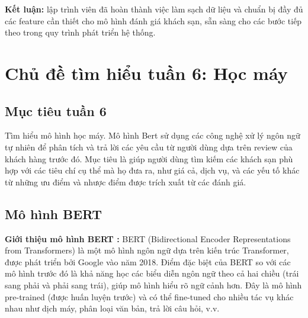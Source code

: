 \textbf{Kết luận:} lập trình viên đã hoàn thành việc làm sạch dữ liệu và chuẩn bị đầy đủ các feature cần thiết cho mô hình đánh giá khách sạn, sẵn sàng cho các bước tiếp theo trong quy trình phát triển hệ thống.

\section{Chủ đề tìm hiểu tuần 6: Học máy}
\subsection{Mục tiêu tuần 6}
\setcounter{figure}{0} 
\renewcommand{\thefigure}{3.\arabic{figure}}
Tìm hiểu mô hình học máy. Mô hình Bert sử dụng các công nghệ xử lý ngôn ngữ tự nhiên để phân tích và trả lời các yêu cầu từ người dùng dựa trên review của khách hàng trước đó. Mục tiêu là giúp người dùng tìm kiếm các khách sạn phù hợp với các tiêu chí cụ thể mà họ đưa ra, như giá cả, dịch vụ, và các yếu tố khác từ những ưu điểm và nhược điểm được trích xuất từ các đánh giá.

\subsection{Mô hình BERT}
 \textbf{Giới thiệu mô hình BERT :} BERT (Bidirectional Encoder Representations from Transformers) là một mô hình ngôn ngữ dựa trên kiến trúc Transformer, được phát triển bởi Google vào năm 2018. Điểm đặc biệt của BERT so với các mô hình trước đó là khả năng học các biểu diễn ngôn ngữ theo cả hai chiều (trái sang phải và phải sang trái), giúp mô hình hiểu rõ ngữ cảnh hơn. Đây là mô hình pre-trained (được huấn luyện trước) và có thể fine-tuned cho nhiều tác vụ khác nhau như dịch máy, phân loại văn bản, trả lời câu hỏi, v.v.
    

